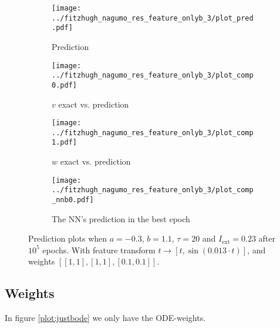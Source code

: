\documentclass[a4paper]{article}
\begin{document}
\begin{figure}[H]
	\centering 
	\begin{subfigure}[b]{0.47\textwidth}
		\centering
		\texttt{[image: ../fitzhugh\_nagumo\_res\_feature\_onlyb\_3/plot\_pred.pdf]}
		\caption{Prediction}
		\label{fig:justb04a}
	\end{subfigure}
	\begin{subfigure}[b]{0.47\textwidth}
		\centering
		\texttt{[image: ../fitzhugh\_nagumo\_res\_feature\_onlyb\_3/plot\_comp0.pdf]}
		\caption{$v$ exact vs. prediction}
		\label{fig:justb04b}
	\end{subfigure}
	\begin{subfigure}[b]{0.47\textwidth}
		\centering
		\texttt{[image: ../fitzhugh\_nagumo\_res\_feature\_onlyb\_3/plot\_comp1.pdf]}
		\caption{$w$ exact vs. prediction}
		\label{fig:justb04c}
	\end{subfigure}
	\begin{subfigure}[b]{0.47\textwidth}
		\centering
		\texttt{[image: ../fitzhugh\_nagumo\_res\_feature\_onlyb\_3/plot\_comp\_nnb0.pdf]}
		\caption{The NN's prediction in the best epoch}
		\label{fig:justb04d}
	\end{subfigure}
	\caption{Prediction plots when $a=-0.3$, $b=1.1$, $\tau=20$ and $ I_{\text{ext}}=0.23$ after $10^5$ epochs. With feature transform $t \rightarrow \left[ t, \sin(0.013\cdot t) \right] $, and weights $\left[ \left[ 1, 1\right], \left[ 1, 1\right], \left[ 0.1, 0.1 \right]\right]$.}
	\label{plot:justb04}
\end{figure} 	



\subsection{Weights}

In figure \ref{plot:justbode} we only have the ODE-weights. 
\end{document}
